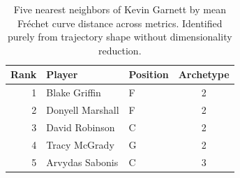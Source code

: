 \begin{table}[htbp]
  \centering\small
  \begin{tabular}{rllc}
    \toprule
    Rank & Player & Position & Archetype \\
    \midrule
    1 & Blake Griffin & F & 2 \\
    2 & Donyell Marshall & F & 2 \\
    3 & David Robinson & C & 2 \\
    4 & Tracy McGrady & G & 2 \\
    5 & Arvydas Sabonis & C & 3 \\
    \bottomrule
  \end{tabular}
  \caption{Five nearest neighbors of Kevin Garnett by mean Fr\'{e}chet curve distance across metrics. Identified purely from trajectory shape without dimensionality reduction.}
  \label{tab:Kevin_Garnett_frechet_curve_neighbors}
\end{table}

